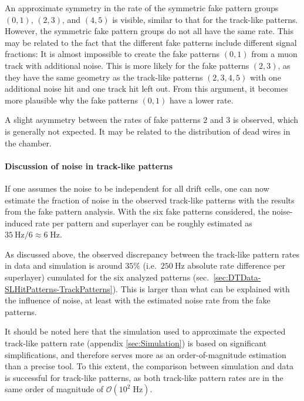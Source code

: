 \par An approximate symmetry in the rate of the symmetric fake pattern groups $(0,1)$, $(2,3)$, and $(4,5)$ is visible, similar to that for the track-like patterns. However, the symmetric fake pattern groups do not all have the same rate. This may be related to the fact that the different fake patterns include different signal fractions: It is almost impossible to create the fake patterns $(0,1)$ from a muon track with additional noise. This is more likely for the fake patterns $(2,3)$, as they have the same geometry as the track-like patterns $(2,3,4,5)$ with one additional noise hit and one track hit left out. From this argument, it becomes more plausible why the fake patterns $(0,1)$ have a lower rate. 
\par A slight asymmetry between the rates of fake patterns $2$ and $3$ is observed, which is generally not expected. It may be related to the distribution of dead wires in the chamber.
\paragraph{Discussion of noise in track-like patterns}
If one assumes the noise to be independent for all drift cells, one can now estimate the fraction of noise in the observed track-like patterns with the results from the fake pattern analysis. With the six fake patterns considered, the noise-induced rate per pattern and superlayer can be roughly estimated as $\SI{35}{\hertz}/6 \approx 6 \;\si{\hertz}$.
\par As discussed above, the observed discrepancy between the track-like pattern rates in data and simulation is around $35\%$ (i.e.\ $\SI{250}{\hertz}$ absolute rate difference per superlayer) cumulated for the six analyzed patterns (sec.\ \ref{sec:DTData-SLHitPatterns-TrackPatterns}). This is larger than what can be explained with the influence of noise, at least with the estimated noise rate from the fake patterns.
\par It should be noted here that the simulation used to approximate the expected track-like pattern rate (appendix \ref{sec:Simulation}) is based on significant simplifications, and therefore serves more as an order-of-magnitude estimation than a precise tool. To this extent, the comparison between simulation and data is successful for track-like patterns, as both track-like pattern rates are in the same order of magnitude of $\mathcal{O}(10^2\;\si{\hertz})$.




